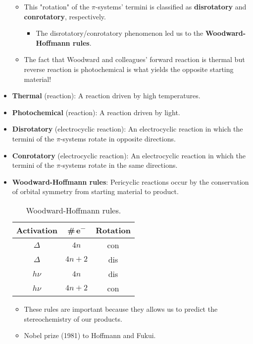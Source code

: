 \documentclass[../notes.tex]{subfiles}
\begin{document}
\begin{itemize}
\begin{itemize}
        \item This "rotation" of the $\pi$-systems' termini is classified as \textbf{disrotatory} and \textbf{conrotatory}, respectively.
        \begin{itemize}
            \item The disrotatory/conrotatory phenomenon led us to the \textbf{Woodward-Hoffmann rules}.
        \end{itemize}
        \item The fact that Woodward and colleagues' forward reaction is thermal but reverse reaction is photochemical is what yields the opposite starting material!
    \end{itemize}
    \item \textbf{Thermal} (reaction): A reaction driven by high temperatures.
    \item \textbf{Photochemical} (reaction): A reaction driven by light.
    \item \textbf{Disrotatory} (electrocyclic reaction): An electrocyclic reaction in which the termini of the $\pi$-systems rotate in opposite directions.
    \item \textbf{Conrotatory} (electrocyclic reaction): An electrocyclic reaction in which the termini of the $\pi$-systems rotate in the same directions.
    \item \textbf{Woodward-Hoffmann rules}: Pericyclic reactions occur by the conservation of orbital symmetry from starting material to product.
    \begin{table}[h!]
        \centering
        \small
        \renewcommand{\arraystretch}{1.2}
        \begin{tabular}{ccc}
            \textbf{Activation} & \textbf{\#\,e\textsuperscript{$\bm{-}$}} & \textbf{Rotation}\\
            \hline
            $\Delta$ & $4n$ & con\\
            $\Delta$ & $4n+2$ & dis\\
            $h\nu$ & $4n$ & dis\\
            $h\nu$ & $4n+2$ & con\\
        \end{tabular}
        \caption{Woodward-Hoffmann rules.}
        \label{tab:WHrules}
    \end{table}
    \begin{itemize}
        \item These rules are important because they allows us to predict the stereochemistry of our products.
        \item Nobel prize (1981) to Hoffmann and Fukui.

\end{itemize}
\end{itemize}
\end{document}
